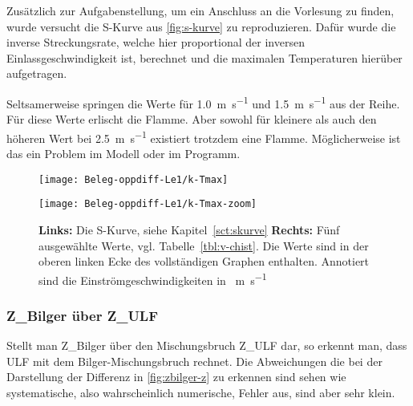Zusätzlich zur Aufgabenstellung, um ein Anschluss an die Vorlesung zu finden, wurde versucht die S-Kurve aus \autoref{fig:s-kurve} zu reproduzieren. Dafür wurde die inverse Streckungsrate, welche hier proportional der inversen Einlassgeschwindigkeit ist, berechnet und die maximalen Temperaturen hierüber aufgetragen.

Seltsamerweise springen die Werte für \SI{1.0}{\meter\per\second} und \SI{1.5}{\meter\per\second} aus der Reihe. Für diese Werte erlischt die Flamme. Aber sowohl für kleinere als auch den höheren Wert bei \SI{2.5}{\meter\per\second} existiert trotzdem eine Flamme. Möglicherweise ist das ein Problem im Modell oder im Programm.

\begin{figure}[H]
    \begin{center}\begin{minipage}{0.49\linewidth}\begin{center}
        \texttt{[image: Beleg-oppdiff-Le1/k-Tmax]}
    \end{center}\end{minipage}\begin{minipage}{0.49\linewidth}\begin{center}
        \texttt{[image: Beleg-oppdiff-Le1/k-Tmax-zoom]}
    \end{center}\end{minipage}\end{center}
    \caption{\textbf{Links:} Die S-Kurve, siehe Kapitel~\ref{sct:skurve} \textbf{Rechts:} Fünf ausgewählte Werte, vgl. Tabelle~\ref{tbl:v-chist}. Die Werte sind in der oberen linken Ecke des vollständigen Graphen enthalten. Annotiert sind die Einströmgeschwindigkeiten in \SI{}{\meter\per\second}}
    \label{fig:s-kurve-invk-ulf}
\end{figure}


\subsubsection{\texorpdfstring{\gls{Z_Bilger}}{ZBilger} über \texorpdfstring{\gls{Z_ULF}}{ZULF}}
\label{sct:oppdiffLe1:ZBilger_Z}

Stellt man \gls{Z_Bilger} über den Mischungsbruch \gls{Z_ULF} dar, so erkennt man, dass \gls{ULF} mit dem Bilger-Mischungsbruch rechnet. Die Abweichungen die bei der Darstellung der Differenz in \autoref{fig:zbilger-z} zu erkennen sind sehen wie systematische, also wahrscheinlich numerische, Fehler aus, sind aber sehr klein.

